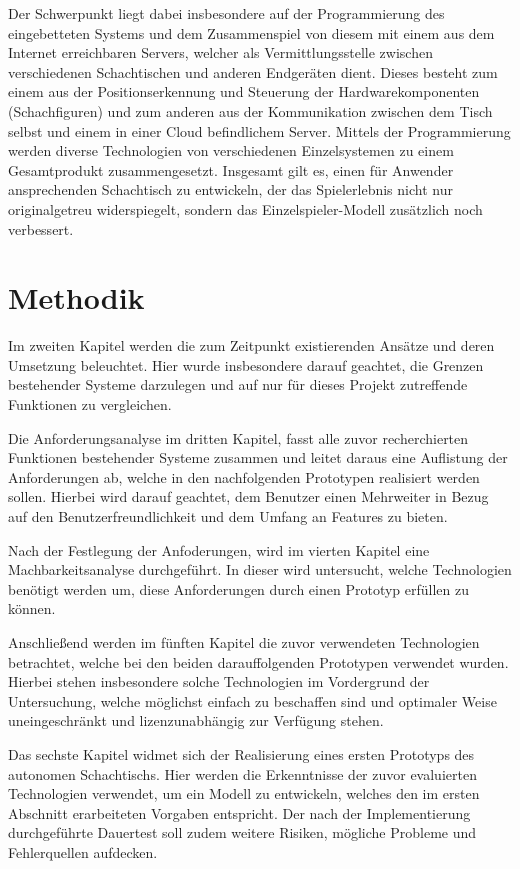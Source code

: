 Der Schwerpunkt liegt dabei insbesondere auf der Programmierung des
eingebetteten Systems und dem Zusammenspiel von diesem mit einem aus dem
Internet erreichbaren Servers, welcher als Vermittlungsstelle zwischen
verschiedenen Schachtischen und anderen Endgeräten dient. Dieses besteht
zum einem aus der Positionserkennung und Steuerung der
Hardwarekomponenten (Schachfiguren) und zum anderen aus der
Kommunikation zwischen dem Tisch selbst und einem in einer Cloud
befindlichem Server. Mittels der Programmierung werden diverse
Technologien von verschiedenen Einzelsystemen zu einem Gesamtprodukt
zusammengesetzt. Insgesamt gilt es, einen für Anwender ansprechenden
Schachtisch zu entwickeln, der das Spielerlebnis nicht nur
originalgetreu widerspiegelt, sondern das Einzelspieler-Modell
zusätzlich noch verbessert.

\hypertarget{methodik}{%
\section{Methodik}\label{methodik}}

Im zweiten Kapitel werden die zum Zeitpunkt existierenden Ansätze und
deren Umsetzung beleuchtet. Hier wurde insbesondere darauf geachtet, die
Grenzen bestehender Systeme darzulegen und auf nur für dieses Projekt
zutreffende Funktionen zu vergleichen.

Die Anforderungsanalyse im dritten Kapitel, fasst alle zuvor
recherchierten Funktionen bestehender Systeme zusammen und leitet daraus
eine Auflistung der Anforderungen ab, welche in den nachfolgenden
Prototypen realisiert werden sollen. Hierbei wird darauf geachtet, dem
Benutzer einen Mehrweiter in Bezug auf den Benutzerfreundlichkeit und
dem Umfang an Features zu bieten.

Nach der Festlegung der Anfoderungen, wird im vierten Kapitel eine
Machbarkeitsanalyse durchgeführt. In dieser wird untersucht, welche
Technologien benötigt werden um, diese Anforderungen durch einen
Prototyp erfüllen zu können.

Anschließend werden im fünften Kapitel die zuvor verwendeten
Technologien betrachtet, welche bei den beiden darauffolgenden
Prototypen verwendet wurden. Hierbei stehen insbesondere solche
Technologien im Vordergrund der Untersuchung, welche möglichst einfach
zu beschaffen sind und optimaler Weise uneingeschränkt und
lizenzunabhängig zur Verfügung stehen.

Das sechste Kapitel widmet sich der Realisierung eines ersten Prototyps
des autonomen Schachtischs. Hier werden die Erkenntnisse der zuvor
evaluierten Technologien verwendet, um ein Modell zu entwickeln, welches
den im ersten Abschnitt erarbeiteten Vorgaben entspricht. Der nach der
Implementierung durchgeführte Dauertest soll zudem weitere Risiken,
mögliche Probleme und Fehlerquellen aufdecken.

